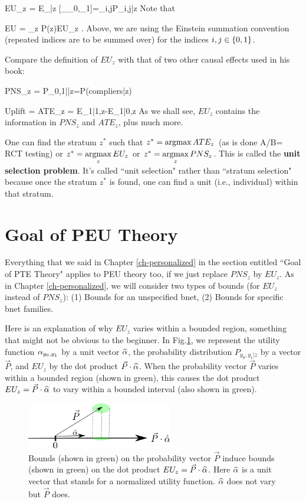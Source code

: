 \beq
EU_z = E_{|z}
[\alp_{\rvy_0,\rvy_1}]=\alp_{i,j}P_{i,j|z}
\eeq
Note that

\beq
EU = \sum_z  P(z)EU_z
\;.
\eeq
Above, we are using the Einstein
 summation convention
(repeated indices are to be summed over)
for the indices $i,j\in \{0,1\}$.

Compare the definition of $EU_z$
with that of two other causal effects used 
in his book:

\beq
PNS_z = P_{0,1||z}=P(compliers|z)
\eeq

\beq
Uplift = ATE_z = E_{1|1,z}-E_{1|0,z}
\eeq
As we shall see,
$EU_z$ contains the information
in $PNS_z$ and $ATE_z$,  plus much more.

 
One can
find the stratum $z^*$
such that
$z^*=\mathop{\mathrm{argmax}}\limits ATE_z$ (as is done A/B= RCT testing) or
 $z^*=\mathop{\mathrm{argmax}}\limits_z EU_z$ or
$z^*=\mathop{\mathrm{argmax}}\limits_z PNS_z$.
This is called the
{\bf unit selection problem}.
It's called ``unit selection"
rather than ``stratum selection" 
because once the  
stratum $z^*$ is found,
one can find a unit 
(i.e., individual) within
that stratum.







\section{Goal of PEU Theory}
Everything that we said 
in Chapter \ref{ch-personalized}
in the section entitled ``Goal 
of PTE Theory"
applies to PEU theory too,
if we just replace $PNS_z$
by $EU_z$.
As in Chapter \ref{ch-personalized}, 
we will consider two types of bounds (for
$EU_z$ instead of $PNS_z$):
(1) Bounds for an unspecified bnet,
(2) Bounds for specific bnet families.


Here is
an explanation 
of why $EU_z$
varies within a bounded region,
something that might 
not be obvious to the beginner.
In  Fig.\ref{fig-peu-utility},
we represent the utility
function $\alpha_{y_0, y_1}$
by a unit vector ${\widehat{\alpha}}$,
the probability distribution 
$P_{y_0, y_1|z}$ by a vector $\vec{P}$,
and $EU_z$ by the dot product 
$\vec{P}\cdot {\widehat{\alpha}}$.
When the probability
vector $\vec{P}$ varies within a bounded region
(shown in green),
this causes
the dot 
product $EU_z=\vec{P}\cdot {\widehat{\alpha}}$
to vary within a bounded interval (also
shown in green).



\begin{figure}[h!]
\centering
\includegraphics[width=2.5in]
{personalized-exp-util/utility.png}
\caption{Bounds (shown in green)
on the probability
vector $\vec{P}$
induce bounds (shown in green) on the dot 
product $EU_z=\vec{P}\cdot {\widehat{\alpha}}$.
Here ${\widehat{\alpha}}$ is a unit vector
that stands for a normalized 
utility function. ${\widehat{\alpha}}$
does not vary but $\vec{P}$ does.
} 
\label{fig-peu-utility}
\end{figure}

